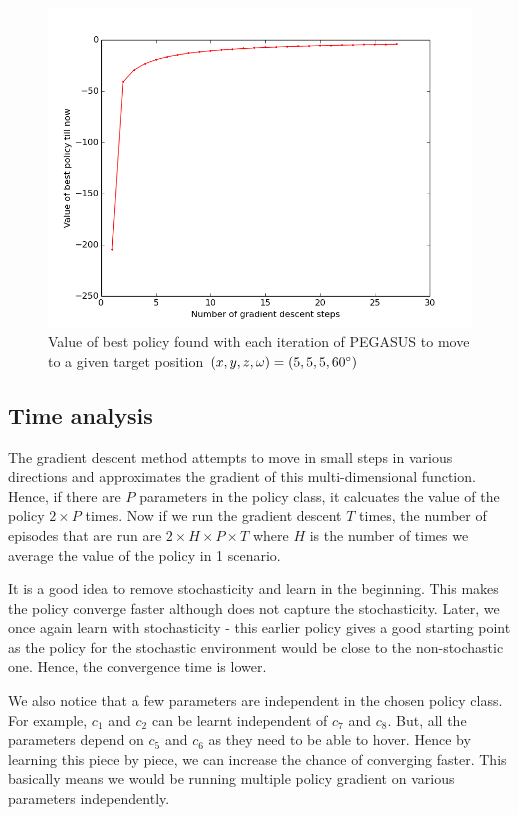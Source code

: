 \documentclass[BTech]{iitmdiss}
\begin{document}
\begin{figure}[h]
  \centering
    \includegraphics[width=\textwidth]{quadrotor_position_control_time.png}
    \caption{Value of best policy found with each iteration of PEGASUS to move to a given target position $(x, y, z, \omega) = (5, 5, 5, 60\protect^{\circ})$}
\end{figure}

\subsection{Time analysis}

The gradient descent method attempts to move in small steps in various directions and approximates the gradient of this multi-dimensional function. Hence, if there are $P$ parameters in the policy class, it calcuates the value of the policy $2 \times P$ times. Now if we run the gradient descent $T$ times, the number of episodes that are run are $2 \times H \times P \times T$ where $H$ is the number of times we average the value of the policy in 1 scenario.

It is a good idea to remove stochasticity and learn in the beginning. This makes the policy converge faster although does not capture the stochasticity. Later, we once again learn with stochasticity - this earlier policy gives a good starting point as the policy for the stochastic environment would be close to the non-stochastic one. Hence, the convergence time is lower.

We also notice that a few parameters are independent in the chosen policy class. For example, $c_1$ and $c_2$ can be learnt independent of $c_7$ and $c_8$. But, all the parameters depend on $c_5$ and $c_6$ as they need to be able to hover. Hence by learning this piece by piece, we can increase the chance of converging faster. This basically means we would be running multiple policy gradient on various parameters independently.
\end{document}
